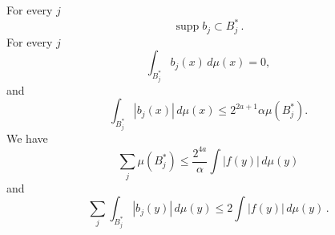 \begin{lemma}
    For every $j$
    \begin{equation}
        \label{eq-supp-bj}
        \operatorname{supp} b_j \subset B_j^*\,.
    \end{equation}
    For every $j$
    \begin{equation}
        \label{eq-bad-mean-zero}
        \int_{B_j^*} b_j(x)\, d\mu(x)=0,
    \end{equation}
    and
     \begin{equation}
        \label{eq-bj-L1}
        \int_{B_j^*} |b_j(x)|\, d\mu(x) \leq 2^{2a+1} \alpha \mu(B_j^*).
    \end{equation}
    We have
    \begin{equation}
        \label{eq-bset-length-sum}
        \sum_j \mu(B_j^*)\leq \frac{2^{4a}}{\alpha}\int |f(y)|\, d\mu(y)
    \end{equation}
    and
    \begin{equation}
    \label{eq-b-L1}
    \sum_{j}\int_{B_j^*} |b_j(y)|\, d\mu(y)\leq 2 \int |f(y)|\, d\mu(y)\,.
    \end{equation}
\end{lemma}

